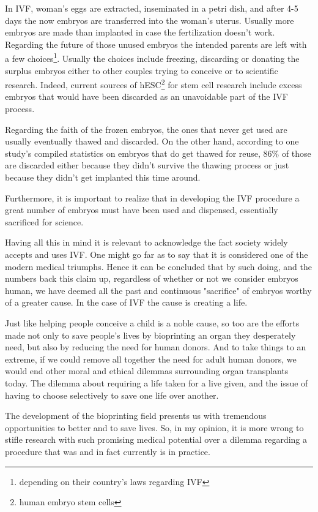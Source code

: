 \documentclass[12pt]{article} %
\begin{document}
In IVF, woman's eggs are extracted, inseminated in a petri dish, and after 4-5 days the now embryos are transferred into the woman's uterus. Usually more embryos are made than implanted in case the fertilization doesn't work. 
Regarding the future of those unused embryos the intended parents are left with a few choices\footnote{depending on their country's laws regarding IVF}. Usually the choices include freezing, discarding or donating the surplus embryos either to other couples trying to conceive or to scientific research. 
Indeed, current sources of hESC\footnote{human embryo stem cells} for stem cell research include excess embryos that would have been discarded as an unavoidable part of the IVF process\cite{Pediatrics:2012}.

Regarding the faith of the frozen embryos, the ones that never get used are usually eventually thawed and discarded. On the other hand, according to one study's \cite{Pavone:2011} compiled statistics on embryos that do get thawed for reuse, 86\% of those are discarded either because they didn't survive the thawing process or just because they didn't get implanted this time around. 

Furthermore, it is important to realize that in developing the IVF procedure a great number of embryos must have been used and dispensed, essentially sacrificed for science. 

Having all this in mind it is relevant to acknowledge the fact society widely accepts and uses IVF. One might go far as to say that it is considered one of the modern medical triumphs. Hence it can be concluded that by such doing, and the numbers back this claim up, regardless of whether or not we consider embryos human, we have deemed all the past and continuous "sacrifice" of embryos worthy of a greater cause. In the case of IVF the cause is creating a life.

Just like helping people conceive a child is a noble cause, so too are the efforts made not only to save people's lives by bioprinting an organ they desperately need, but also by reducing the need for human donors. And to take things to an extreme, if we could remove all together the need for adult human donors, we would end other moral and ethical dilemmas surrounding organ transplants today. The dilemma about requiring a life taken for a live given, and the issue of having to choose selectively to save one life over another. 

The development of the bioprinting field presents us with tremendous opportunities to better and to save lives. So, in my opinion, it is more wrong to stifle research with such promising medical potential over a dilemma regarding a procedure that was and in fact currently is in practice.
\end{document}
